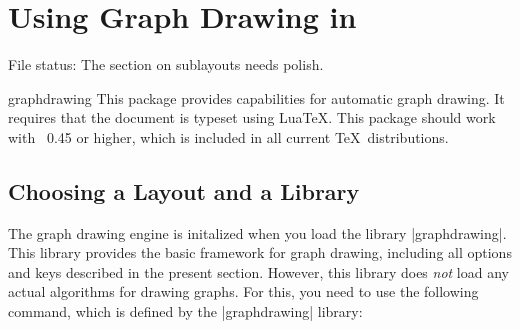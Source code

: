 %
%
%


\section{Using Graph Drawing in \tikzname}

{}

File status: The section on sublayouts needs polish.


\begin{tikzlibrary}{graphdrawing}
  This package provides capabilities for automatic graph drawing. It
  requires that the document is typeset using Lua\TeX. This package
  should work with \LuaTeX\ 0.45 or higher, which is included in all
  current \TeX\ distributions. 
\end{tikzlibrary}


\subsection{Choosing a Layout and a Library}

The graph drawing engine is initalized when you load the library
|graphdrawing|. This library provides the basic framework for graph
drawing, including all options and keys described in the present
section. However, this library does \emph{not} load any actual
algorithms for drawing graphs. For this, you need to use the following
command, which is defined by the |graphdrawing| library:

